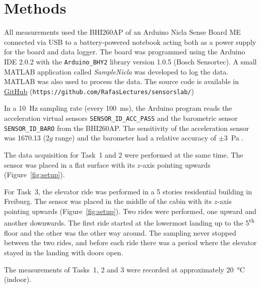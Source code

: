 \documentclass[DIV=14]{scrartcl}
\begin{document}
    \clearpage


    \section{Methods}
    All measurements used the BHI260AP of an Arduino Nicla Sense Board ME connected via USB to a battery-powered
    notebook acting both as a power supply for the board and data logger.
    The board was programmed using the Arduino IDE 2.0.2 with the \texttt{Arduino\_BHY2} library version 1.0.5 (Bosch Sensortec).
    A small MATLAB application called \textit{SampleNicla} was developed to log the data.
    MATLAB was also used to process the data.
    The source code is available in \href{https://github.com/RafasLectures/sensorslab/blob/main/SampleNicla.mlapp}{GitHub}
    (\texttt{https://github.com/RafasLectures/sensorslab/})

    In a \SI{10}{\hertz} sampling rate (every \SI{100}{\milli\second}), the Arduino program reads the acceleration
    virtual sensors \texttt{SENSOR\_ID\_ACC\_PASS} and the barometric sensor
    \texttt{SENSOR\_ID\_BARO} from the BHI260AP.
    The sensitivity of the acceleration sensor was \SI{1670.13}{} (2$g$ range) and the
    barometer had a relative accuracy of $\pm$\SI{3}{\pascal} \cite{BHI260}.

    The data acquisition for Task~1 and 2 were performed at the same time.
    The sensor was placed in a flat surface with its $z$-axis pointing upwards (Figure~\ref{fig:setup}).

    For Task~3, the elevator ride was performed in a 5 stories residential building in Freiburg.
    The sensor was placed in the middle of the cabin with its $z$-axis pointing upwards (Figure~\ref{fig:setup}).
    Two rides were performed, one upward and another downwards.
    The first ride started at the lowermost landing up to the 5\textsuperscript{th} floor and the other was the
    other way around.
    The sampling never stopped between the two rides, and before each ride there was a period where the elevator
    stayed in the landing with doors open.

    The measurements of Tasks~1, 2 and 3 were recorded at approximately \SI{20}{\celsius} (indoor).

    \vspace{3em}
\end{document}
